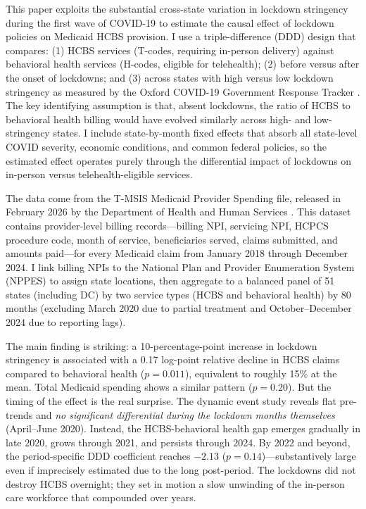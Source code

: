 \documentclass[12pt]{article}
\begin{document}
This paper exploits the substantial cross-state variation in lockdown stringency during the first wave of COVID-19 to estimate the causal effect of lockdown policies on Medicaid HCBS provision. I use a triple-difference (DDD) design that compares: (1) HCBS services (T-codes, requiring in-person delivery) against behavioral health services (H-codes, eligible for telehealth); (2) before versus after the onset of lockdowns; and (3) across states with high versus low lockdown stringency as measured by the Oxford COVID-19 Government Response Tracker \citep{hale2021global}. The key identifying assumption is that, absent lockdowns, the ratio of HCBS to behavioral health billing would have evolved similarly across high- and low-stringency states. I include state-by-month fixed effects that absorb all state-level COVID severity, economic conditions, and common federal policies, so the estimated effect operates purely through the differential impact of lockdowns on in-person versus telehealth-eligible services.

The data come from the T-MSIS Medicaid Provider Spending file, released in February 2026 by the Department of Health and Human Services \citep{hhs2026tmsis}. This dataset contains provider-level billing records---billing NPI, servicing NPI, HCPCS procedure code, month of service, beneficiaries served, claims submitted, and amounts paid---for every Medicaid claim from January 2018 through December 2024. I link billing NPIs to the National Plan and Provider Enumeration System (NPPES) to assign state locations, then aggregate to a balanced panel of 51 states (including DC) by two service types (HCBS and behavioral health) by 80 months (excluding March 2020 due to partial treatment and October--December 2024 due to reporting lags).

The main finding is striking: a 10-percentage-point increase in lockdown stringency is associated with a 0.17 log-point relative decline in HCBS claims compared to behavioral health ($p = 0.011$), equivalent to roughly 15\% at the mean. Total Medicaid spending shows a similar pattern ($p = 0.20$). But the timing of the effect is the real surprise. The dynamic event study reveals flat pre-trends and \textit{no significant differential during the lockdown months themselves} (April--June 2020). Instead, the HCBS-behavioral health gap emerges gradually in late 2020, grows through 2021, and persists through 2024. By 2022 and beyond, the period-specific DDD coefficient reaches $-2.13$ ($p = 0.14$)---substantively large even if imprecisely estimated due to the long post-period. The lockdowns did not destroy HCBS overnight; they set in motion a slow unwinding of the in-person care workforce that compounded over years.
\end{document}

